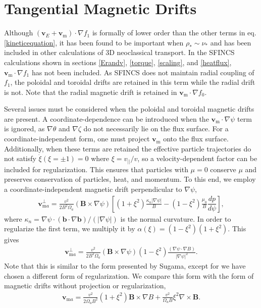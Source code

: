 \documentclass[aip, pop, preprint]{revtex4-1}
\numberwithin{figure}{section}
\numberwithin{equation}{section}
\newcommand{\der}[2]{\dfrac{d #1}{d  #2}}
\begin{document}
\FloatBarrier

\section{Tangential Magnetic Drifts}\label{mds}
Although $(\bm{v}_E + \bm{v}_{\text{m}}) \cdot \nabla f_1$ is formally of lower order than the other terms in eq. \ref{kineticequation}, it has been found to be important when $\rho_* \sim \nu_*$ \cite{Calvo2016} and has been included in other calculations of 3D neoclassical transport. In the SFINCS calculations shown in sections \ref{Erandv}, \ref{torque}, \ref{scaling}, and \ref{heatflux}, $\bm{v}_{\text{m}} \cdot \nabla f_1$ has not been included. As SFINCS does not maintain radial coupling of $f_1$, the poloidal and toroidal drifts are retained in this term while the radial drift is not. Note that the radial magnetic drift is retained in $\bm{v}_{\text{m}} \cdot \nabla f_0$. 

Several issues must be considered when the poloidal and toroidal magnetic drifts are present. A coordinate-dependence can be introduced when the $\bm{v}_{\text{m}} \cdot \nabla \psi$ term is ignored, as $\nabla \theta$ and $\nabla \zeta$ do not necessarily lie on the flux surface. For a coordinate-independent form, one must project $\bm{v}_{\text{m}}$ onto the flux surface. Additionally, when these terms are retained the effective particle trajectories do not satisfy $\dot{\xi} (\xi = \pm 1) = 0$ where $\xi = v_{||}/v$, so a velocity-dependent factor can be included for regularization.  This ensures that particles with $\mu = 0$ conserve $\mu$ and preserves conservation of particles, heat, and momentum.\cite{Sugama2016} To this end, we employ a coordinate-independent magnetic drift perpendicular to $\nabla \psi$,
\begin{gather}
\bm{v}_{\text{m}a}^{\perp} = \frac{v^2}{2B^2 \Omega_a} (\bm{B} \times \nabla \psi) \left[(1+\xi^2) \frac{\kappa_n \rvert \nabla \psi \rvert}{B} - (1 - \xi^2) \frac{\mu_0}{B} \der{p}{\psi} \right],
\end{gather}
where $\kappa_n = \nabla \psi \cdot (\bm{b} \cdot \nabla \bm{b})/(\rvert \nabla \psi \rvert)$ is the normal curvature. In order to regularize the first term, we multiply it by $\alpha(\xi) = (1-\xi^2)(1+\xi^2)$. This gives
\begin{gather}
\bm{v}_{\text{m}a}^{\perp} = \frac{v^2}{2B^2 \Omega_a} (\bm{B} \times \nabla \psi) (1 - \xi^2) \frac{(\nabla \psi \cdot \nabla B)}{\rvert \nabla \psi \rvert^2}.
\end{gather}
Note that this is similar to the form presented by Sugama,\cite{Sugama2016} except for we have chosen a different form of regularization. We compare this form with the form of magnetic drifts without projection or regularization,
\begin{gather}
\bm{v}_{\text{m}a} = \frac{v^2}{2 \Omega_a B^2} (1 + \xi^2) \bm{B} \times \nabla B + \frac{v^2}{\Omega_a B} \xi^2 \nabla \times \bm{B}.
\end{gather}
\end{document}
